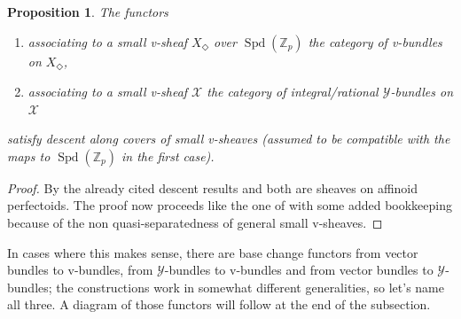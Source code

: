 \documentclass[10pt,twoside]{article}
\numberwithin{equation}{section}
\theoremstyle{plain}
\newtheorem{myprop}[mythm]{Proposition}
\theoremstyle{definition}
\DeclareMathOperator{\Spd}{Spd}
\newcommand{\ZZ}{\mathbb{Z}}
\newcommand{\MCX}{\mathcal{X}}
\newcommand{\MCY}{\mathcal{Y}}
\let \diamond \Diamond
\begin{document}
\begin{myprop}\label{vDescentForVBundles}
The functors
\begin{enumerate}
    \item associating to a small v-sheaf \(X_{\diamond}\) over \(\Spd(\ZZ_p)\) the category of v-bundles on \(X_\diamond\),
    \item associating to a small v-sheaf \(\MCX\) the category of integral/rational \(\MCY\)-bundles on \(\MCX\)
\end{enumerate}
 satisfy descent along covers of small v-sheaves (assumed to be compatible with the maps to \(\Spd(\ZZ_p)\) in the first case).
\end{myprop}

\begin{proof}
By the already cited descent results \cite[17.1.8]{SW20} and \cite[19.5.3]{SW20} both are sheaves on affinoid perfectoids. The proof now proceeds like the one of  with some added bookkeeping because of the non quasi-separatedness of general small v-sheaves.
\end{proof}

In cases where this makes sense, there are base change functors from vector bundles to v-bundles, from \(\MCY\)-bundles to v-bundles and from vector bundles to \(\MCY\)-bundles; the constructions work in somewhat different generalities, so let's name all three. A diagram of those functors will follow at the end of the subsection.
\end{document}
